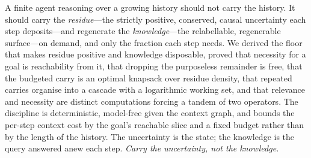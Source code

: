 \documentclass[11pt,twocolumn,a4paper]{article}
\theoremstyle{thmstyle}
\theoremstyle{definition}
\theoremstyle{remark}
\begin{document}
A finite agent reasoning over a growing history should not carry the history. It
should carry the \emph{residue}---the strictly positive, conserved, causal
uncertainty each step deposits---and regenerate the \emph{knowledge}---the
relabellable, regenerable surface---on demand, and only the fraction each step
needs. We derived the floor that makes residue positive and knowledge
disposable, proved that necessity for a goal is reachability from it, that
dropping the purposeless remainder is free, that the budgeted carry is an optimal
knapsack over residue density, that repeated carries organise into a cascade with
a logarithmic working set, and that relevance and necessity are distinct
computations forcing a tandem of two operators. The discipline is deterministic,
model-free given the context graph, and bounds the per-step context cost by the
goal's reachable slice and a fixed budget rather than by the length of the
history. The uncertainty is the state; the knowledge is the query answered anew
each step. \emph{Carry the uncertainty, not the knowledge.}



\end{document}
